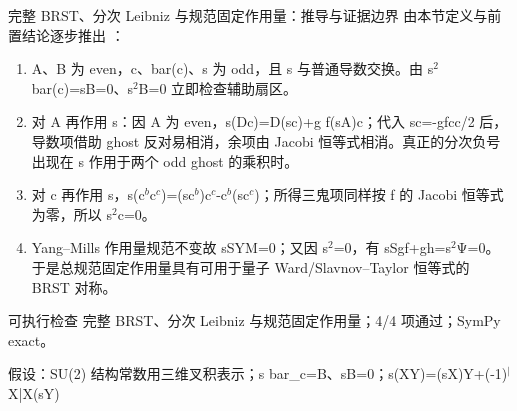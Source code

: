 \begin{frame}[t]{完整 BRST、分次 Leibniz 与规范固定作用量：推导与证据边界}
\footnotesize
{}\quad 由本节定义与前置结论逐步推出 ：
\begin{enumerate}
\item A、B 为 even，c、bar(c)、s 为 odd，且 s 与普通导数交换。由 s\ensuremath{^{2}}bar(c)=sB=0、s\ensuremath{^{2}}B=0 立即检查辅助扇区。
\item 对 A 再作用 s：因 A 为 even，s(Dc)=D(sc)+g f(sA)c；代入 sc=-gfcc/\allowbreak{}2 后，导数项借助 ghost 反对易相消，余项由 Jacobi 恒等式相消。真正的分次负号出现在 s 作用于两个 odd ghost 的乘积时。
\item 对 c 再作用 s，s(c\ensuremath{^{b}}c\ensuremath{^{c}})=(sc\ensuremath{^{b}})c\ensuremath{^{c}}-c\ensuremath{^{b}}(sc\ensuremath{^{c}})；所得三鬼项同样按 f 的 Jacobi 恒等式为零，所以 s\ensuremath{^{2}}c=0。
\item Yang--Mills 作用量规范不变故 sSYM=0；又因 s\ensuremath{^{2}}=0，有 sSgf+gh=s\ensuremath{^{2}}Ψ=0。于是总规范固定作用量具有可用于量子 Ward/\allowbreak{}Slavnov--Taylor 恒等式的 BRST 对称。
\end{enumerate}\begin{block}{可执行检查}
\quad 完整 BRST、分次 Leibniz 与规范固定作用量；4/4 项通过；SymPy exact。
\par\scriptsize 假设：SU(2) 结构常数用三维叉积表示；s bar\_c=B、sB=0；s(XY)=(sX)Y+(-1)\ensuremath{^{|}}X|X(sY)
\end{block}
\end{frame}

